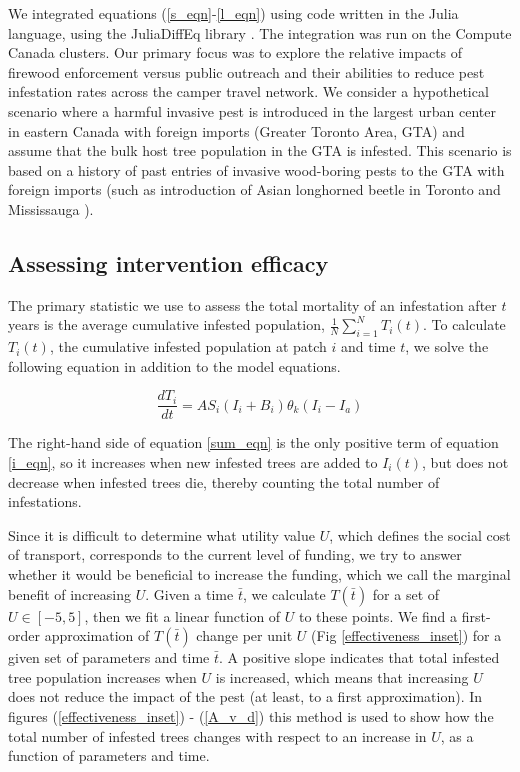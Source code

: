 We integrated equations (\ref{s_eqn}-\ref{l_eqn}) using code written in the Julia language, using the JuliaDiffEq library \cite{rackauckas2017differentialequations}. The integration was run on the Compute Canada clusters. Our primary focus was to explore the relative impacts of firewood enforcement versus public outreach and their abilities to reduce pest infestation rates across the camper travel network. We consider a hypothetical scenario where a harmful invasive pest is introduced in the largest urban center in eastern Canada with foreign imports (Greater Toronto Area, GTA) and assume that the bulk host tree population in the GTA is infested. This scenario is based on a history of past entries of invasive wood-boring pests to the GTA with foreign imports (such as introduction of Asian longhorned beetle in Toronto and Mississauga \cite{turgeon2015decade}).


\subsection{Assessing intervention efficacy}

The primary statistic we use to assess the total mortality of an infestation after $t$ years is the average cumulative infested population, $\frac{1}{N} \sum_{i=1}^N T_i(t)$. To calculate $T_i(t)$, the cumulative infested population at patch $i$ and time $t$, we solve the following equation in addition to the model equations.

\begin{equation}
    \frac{dT_i}{dt}= A S_i (I_i+ B_i)\theta_k(I_i - I_a)
    \label{sum_eqn}
\end{equation}

The right-hand side of equation \ref{sum_eqn} is the only positive term of equation \ref{i_eqn}, so it increases when new infested trees are added to $I_i(t)$, but does not decrease when infested trees die, thereby counting the total number of infestations.

Since it is difficult to determine what utility value $U$, which defines the social cost of transport, corresponds to the current level of funding, we try to answer whether it would be beneficial to increase the funding, which we call the marginal benefit of increasing $U$. Given a time $\bar{t}$, we calculate $T(\bar{t})$ for a set of $U \in [-5,5]$, then we fit a linear function of $U$ to these points. We find a first-order approximation of $T(\bar{t})$ change per unit $U$ (Fig \ref{effectiveness_inset}) for a given set of parameters and time $\bar{t}$. A positive slope indicates that total infested tree population increases when $U$ is increased, which means that increasing $U$ does not reduce the impact of the pest (at least, to a first approximation). In figures (\ref{effectiveness_inset}) - (\ref{A_v_d}) this method is used to show how the total number of infested trees changes with respect to an increase in $U$, as a function of parameters and time.



